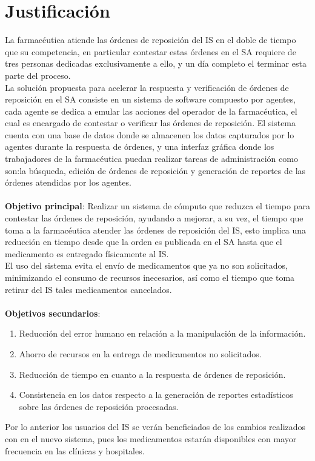 \documentclass[letterpaper,11pt]{article}
\begin{document}
\section{Justificación}
La farmacéutica atiende las órdenes de reposición del IS en el doble de tiempo que su competencia, en particular contestar estas órdenes en el SA requiere de tres personas dedicadas exclusivamente a ello, y un día completo el terminar esta parte del proceso.\\
La solución propuesta para acelerar la respuesta y verificación de órdenes de reposición en el SA consiste en un sistema de software compuesto por agentes, cada agente se dedica a emular las acciones del operador de la farmacéutica, el cual es encargado de contestar o verificar las órdenes de reposición. El sistema cuenta con una base de datos donde se almacenen los datos capturados por lo agentes durante la respuesta de órdenes, y una interfaz gráfica donde los trabajadores de la farmacéutica puedan realizar tareas de administración como son:la búsqueda, edición de órdenes de reposición y generación de reportes de las órdenes atendidas por los agentes.\\
\\
\textbf{Objetivo principal}: Realizar un sistema de cómputo que reduzca el tiempo para contestar las órdenes de reposición, ayudando a mejorar, a su vez, el tiempo que toma a la farmacéutica atender las órdenes de reposición del IS, esto implica una reducción en tiempo desde que la orden es publicada en el SA hasta que el medicamento es entregado físicamente al IS.\\
El uso del sistema evita el envío de medicamentos que ya no son solicitados, minimizando el consumo de recursos inecesarios, así como el tiempo que toma retirar del IS tales medicamentos cancelados.\\
\\
\textbf{Objetivos secundarios}:
\begin{enumerate}
\item Reducción del error humano en relación a la manipulación de la información.
\item Ahorro de recursos en la entrega de medicamentos no solicitados.
\item Reducción de tiempo en cuanto a la respuesta de órdenes de reposición.
\item Consistencia en los datos respecto a la generación de reportes estadísticos sobre las órdenes de reposición procesadas.
\end{enumerate}
Por lo anterior los usuarios del IS se verán beneficiados de los cambios realizados con en el nuevo sistema, pues los medicamentos estarán disponibles con mayor frecuencia en las clínicas y hospitales.
\end{document}
